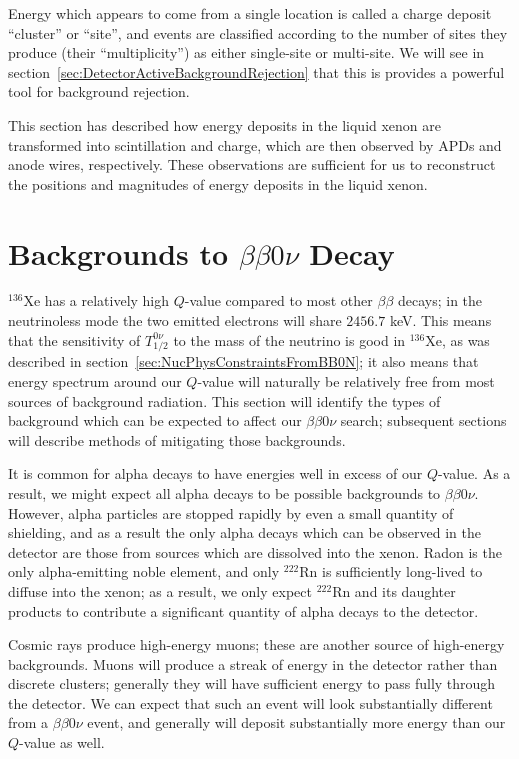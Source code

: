 Energy which appears to come from a single location is called a charge deposit ``cluster'' or ``site'', and events are classified according to the number of sites they produce (their ``multiplicity'') as either single-site or multi-site.  We will see in section~\ref{sec:DetectorActiveBackgroundRejection} that this is provides a powerful tool for background rejection.

This section has described how energy deposits in the liquid xenon are transformed into scintillation and charge, which are then observed by APDs and anode wires, respectively.  These observations are sufficient for us to reconstruct the positions and magnitudes of energy deposits in the liquid xenon.

\section{Backgrounds to \texorpdfstring{$\beta\beta 0\nu$}{Neutrinoless Double-Beta} Decay}\label{sec:DetectorBackgrounds}

$^{136}$Xe has a relatively high $Q$-value compared to most other $\beta\beta$ decays; in the neutrinoless mode the two emitted electrons will share $2456.7$ keV.  This means that the sensitivity of $T_{1/2}^{0\nu}$ to the mass of the neutrino is good in $^{136}$Xe, as was described in section~\ref{sec:NucPhysConstraintsFromBB0N}; it also means that energy spectrum around our $Q$-value will naturally be relatively free from most sources of background radiation.  This section will identify the types of background which can be expected to affect our $\beta\beta 0\nu$ search; subsequent sections will describe methods of mitigating those backgrounds.

It is common for alpha decays to have energies well in excess of our $Q$-value.  As a result, we might expect all alpha decays to be possible backgrounds to $\beta\beta 0\nu$.  However, alpha particles are stopped rapidly by even a small quantity of shielding, and as a result the only alpha decays which can be observed in the detector are those from sources which are dissolved into the xenon.  Radon is the only alpha-emitting noble element, and only $^{222}$Rn is sufficiently long-lived to diffuse into the xenon; as a result, we only expect $^{222}$Rn and its daughter products to contribute a significant quantity of alpha decays to the detector.

Cosmic rays produce high-energy muons; these are another source of high-energy backgrounds.  Muons will produce a streak of energy in the detector rather than discrete clusters; generally they will have sufficient energy to pass fully through the detector.  We can expect that such an event will look substantially different from a $\beta\beta 0\nu$ event, and generally will deposit substantially more energy than our $Q$-value as well.

